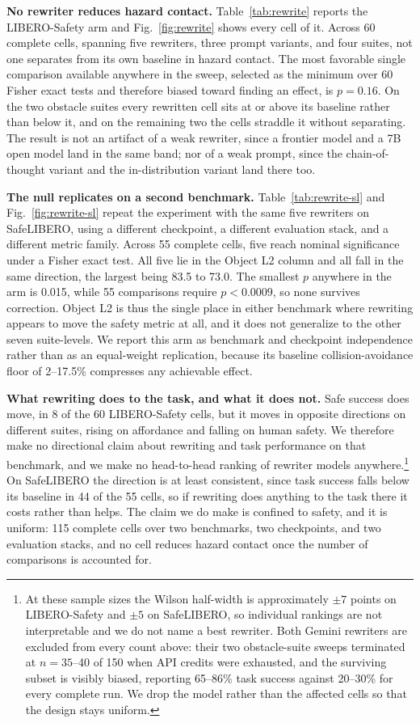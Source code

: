 \documentclass[conference]{IEEEtran}
\begin{document}
\textbf{No rewriter reduces hazard contact.} Table~\ref{tab:rewrite} reports the LIBERO-Safety arm and Fig.~\ref{fig:rewrite} shows every cell of it. Across 60 complete cells, spanning five rewriters, three prompt variants, and four suites, not one separates from its own baseline in hazard contact. The most favorable single comparison available anywhere in the sweep, selected as the minimum over 60 Fisher exact tests and therefore biased toward finding an effect, is $p=0.16$. On the two obstacle suites every rewritten cell sits at or above its baseline rather than below it, and on the remaining two the cells straddle it without separating. The result is not an artifact of a weak rewriter, since a frontier model and a 7B open model land in the same band; nor of a weak prompt, since the chain-of-thought variant and the in-distribution variant land there too.

\textbf{The null replicates on a second benchmark.} Table~\ref{tab:rewrite-sl} and Fig.~\ref{fig:rewrite-sl} repeat the experiment with the same five rewriters on SafeLIBERO, using a different checkpoint, a different evaluation stack, and a different metric family. Across 55 complete cells, five reach nominal significance under a Fisher exact test. All five lie in the Object L2 column and all fall in the same direction, the largest being 83.5 to 73.0. The smallest $p$ anywhere in the arm is 0.015, while 55 comparisons require $p<0.0009$, so none survives correction. Object L2 is thus the single place in either benchmark where rewriting appears to move the safety metric at all, and it does not generalize to the other seven suite-levels. We report this arm as benchmark and checkpoint independence rather than as an equal-weight replication, because its baseline collision-avoidance floor of 2--17.5\% compresses any achievable effect.

\textbf{What rewriting does to the task, and what it does not.} Safe success does move, in 8 of the 60 LIBERO-Safety cells, but it moves in opposite directions on different suites, rising on affordance and falling on human safety. We therefore make no directional claim about rewriting and task performance on that benchmark, and we make no head-to-head ranking of rewriter models anywhere.\footnote{At these sample sizes the Wilson half-width is approximately $\pm7$ points on LIBERO-Safety and $\pm5$ on SafeLIBERO, so individual rankings are not interpretable and we do not name a best rewriter. Both Gemini rewriters are excluded from every count above: their two obstacle-suite sweeps terminated at $n{=}35$--40 of 150 when API credits were exhausted, and the surviving subset is visibly biased, reporting 65--86\% task success against 20--30\% for every complete run. We drop the model rather than the affected cells so that the design stays uniform.} On SafeLIBERO the direction is at least consistent, since task success falls below its baseline in 44 of the 55 cells, so if rewriting does anything to the task there it costs rather than helps. The claim we do make is confined to safety, and it is uniform: 115 complete cells over two benchmarks, two checkpoints, and two evaluation stacks, and no cell reduces hazard contact once the number of comparisons is accounted for.
\end{document}
